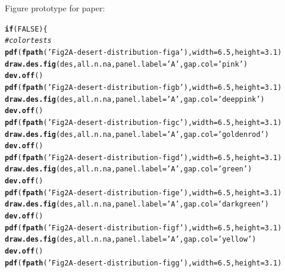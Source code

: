\documentclass{article}\usepackage[]{graphicx}\usepackage[]{color}
\makeatletter
\newcommand{\hlnum}[1]{\textcolor[rgb]{0.686,0.059,0.569}{#1}}%
\newcommand{\hlstr}[1]{\textcolor[rgb]{0.192,0.494,0.8}{#1}}%
\newcommand{\hlcom}[1]{\textcolor[rgb]{0.678,0.584,0.686}{\textit{#1}}}%
\newcommand{\hlstd}[1]{\textcolor[rgb]{0.345,0.345,0.345}{#1}}%
\newcommand{\hlkwa}[1]{\textcolor[rgb]{0.161,0.373,0.58}{\textbf{#1}}}%
\newcommand{\hlkwc}[1]{\textcolor[rgb]{0.333,0.667,0.333}{#1}}%
\newcommand{\hlkwd}[1]{\textcolor[rgb]{0.737,0.353,0.396}{\textbf{#1}}}%
\newenvironment{kframe}{%
 \def\at@end@of@kframe{}%
 \ifinner\ifhmode%
  \def\at@end@of@kframe{\end{minipage}}%
  \begin{minipage}{\columnwidth}%
 \fi\fi%
 \def\FrameCommand##1{\hskip\@totalleftmargin \hskip-\fboxsep
 \colorbox{shadecolor}{##1}\hskip-\fboxsep
     \hskip-\linewidth \hskip-\@totalleftmargin \hskip\columnwidth}%
 \MakeFramed {\advance\hsize-\width
   \@totalleftmargin\z@ \linewidth\hsize
   \@setminipage}}%
 {\par\unskip\endMakeFramed%
 \at@end@of@kframe}
\newenvironment{knitrout}{}{} %
\makeatother
\begin{document}
Figure prototype for paper:

\begin{knitrout}\footnotesize
{}\color{fgcolor}\begin{kframe}
\begin{alltt}
\hlkwa{if}\hlstd{(}\hlnum{FALSE}\hlstd{)\{}
  \hlcom{# color tests}
  \hlkwd{pdf}\hlstd{(}\hlkwd{fpath}\hlstd{(}\hlstr{'Fig2A-desert-distribution-figa'}\hlstd{),} \hlkwc{width}\hlstd{=}\hlnum{6.5}\hlstd{,} \hlkwc{height}\hlstd{=}\hlnum{3.1}\hlstd{)}
  \hlkwd{draw.des.fig}\hlstd{(des, all.n.na,} \hlkwc{panel.label}\hlstd{=}\hlstr{'A'}\hlstd{,}\hlkwc{gap.col} \hlstd{=} \hlstr{'pink'}\hlstd{)}
  \hlkwd{dev.off}\hlstd{()}
  \hlkwd{pdf}\hlstd{(}\hlkwd{fpath}\hlstd{(}\hlstr{'Fig2A-desert-distribution-figb'}\hlstd{),} \hlkwc{width}\hlstd{=}\hlnum{6.5}\hlstd{,} \hlkwc{height}\hlstd{=}\hlnum{3.1}\hlstd{)}
  \hlkwd{draw.des.fig}\hlstd{(des, all.n.na,} \hlkwc{panel.label}\hlstd{=}\hlstr{'A'}\hlstd{,}\hlkwc{gap.col} \hlstd{=} \hlstr{'deeppink'}\hlstd{)}
  \hlkwd{dev.off}\hlstd{()}
  \hlkwd{pdf}\hlstd{(}\hlkwd{fpath}\hlstd{(}\hlstr{'Fig2A-desert-distribution-figc'}\hlstd{),} \hlkwc{width}\hlstd{=}\hlnum{6.5}\hlstd{,} \hlkwc{height}\hlstd{=}\hlnum{3.1}\hlstd{)}
  \hlkwd{draw.des.fig}\hlstd{(des, all.n.na,} \hlkwc{panel.label}\hlstd{=}\hlstr{'A'}\hlstd{,}\hlkwc{gap.col} \hlstd{=} \hlstr{'goldenrod'}\hlstd{)}
  \hlkwd{dev.off}\hlstd{()}
  \hlkwd{pdf}\hlstd{(}\hlkwd{fpath}\hlstd{(}\hlstr{'Fig2A-desert-distribution-figd'}\hlstd{),} \hlkwc{width}\hlstd{=}\hlnum{6.5}\hlstd{,} \hlkwc{height}\hlstd{=}\hlnum{3.1}\hlstd{)}
  \hlkwd{draw.des.fig}\hlstd{(des, all.n.na,} \hlkwc{panel.label}\hlstd{=}\hlstr{'A'}\hlstd{,}\hlkwc{gap.col} \hlstd{=} \hlstr{'green'}\hlstd{)}
  \hlkwd{dev.off}\hlstd{()}
  \hlkwd{pdf}\hlstd{(}\hlkwd{fpath}\hlstd{(}\hlstr{'Fig2A-desert-distribution-fige'}\hlstd{),} \hlkwc{width}\hlstd{=}\hlnum{6.5}\hlstd{,} \hlkwc{height}\hlstd{=}\hlnum{3.1}\hlstd{)}
  \hlkwd{draw.des.fig}\hlstd{(des, all.n.na,} \hlkwc{panel.label}\hlstd{=}\hlstr{'A'}\hlstd{,}\hlkwc{gap.col} \hlstd{=} \hlstr{'darkgreen'}\hlstd{)}
  \hlkwd{dev.off}\hlstd{()}
  \hlkwd{pdf}\hlstd{(}\hlkwd{fpath}\hlstd{(}\hlstr{'Fig2A-desert-distribution-figf'}\hlstd{),} \hlkwc{width}\hlstd{=}\hlnum{6.5}\hlstd{,} \hlkwc{height}\hlstd{=}\hlnum{3.1}\hlstd{)}
  \hlkwd{draw.des.fig}\hlstd{(des, all.n.na,} \hlkwc{panel.label}\hlstd{=}\hlstr{'A'}\hlstd{,}\hlkwc{gap.col} \hlstd{=} \hlstr{'yellow'}\hlstd{)}
  \hlkwd{dev.off}\hlstd{()}
  \hlkwd{pdf}\hlstd{(}\hlkwd{fpath}\hlstd{(}\hlstr{'Fig2A-desert-distribution-figg'}\hlstd{),} \hlkwc{width}\hlstd{=}\hlnum{6.5}\hlstd{,} \hlkwc{height}\hlstd{=}\hlnum{3.1}\hlstd{)}

\end{alltt}
\end{kframe}
\end{knitrout}
\end{document}
